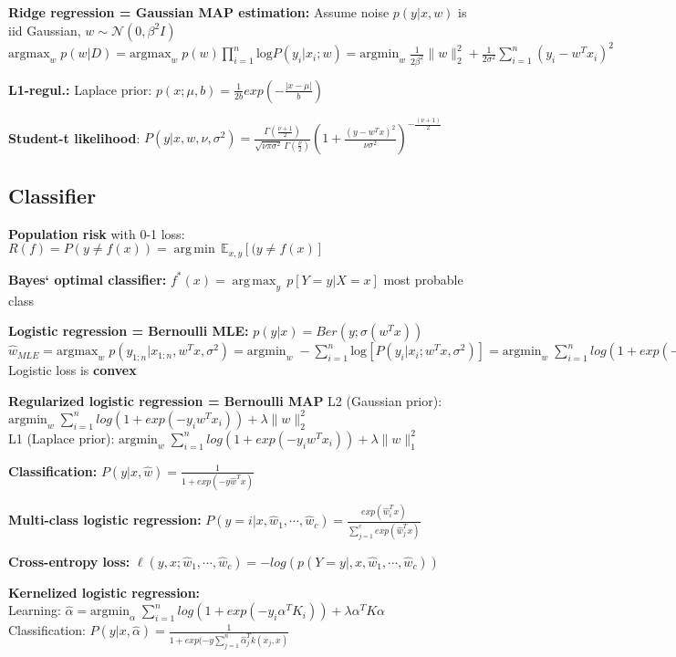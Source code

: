     \textbf{Ridge regression = Gaussian MAP estimation:}
    Assume noise $p(y|x, w)$ is iid Gaussian, $w \sim \mathcal{N}(0, \beta^2I)$
    $ \mathrm{argmax}_w\; p(w|D) =  \mathrm{argmax}_w\; p(w) \prod_{i=1}^n \mathrm{log}P(y_i|x_i;w)= \mathrm{argmin}_w\; \frac{1}{2\beta^2} \| w \|_2^2 + \frac{1}{2\sigma^2}\sum_{i=1}^n (y_i - w^T x_i)^2$

    \textbf{L1-regul.:} Laplace prior: $p(x; \mu, b) = \frac{1}{2b} exp(-\frac{|x - \mu|}{b})$
    
    \textbf{Student-t likelihood}: ${P(y|x, w, \nu, \sigma^2)={\frac {\Gamma ({\frac {\nu +1}{2}})}{{\sqrt {\nu \pi \sigma^2}}\,\Gamma ({\frac {\nu }{2}})}}\left(1+{\frac {
    (y-w^Tx)^{2}}{\nu \sigma^2}}\right)^{-\frac{(\nu +1)}{2}}}$
\subsection{ Classifier}
    \textbf{Population risk} with 0-1 loss:
    $R(f) = P(y \neq f(x)) = { \operatorname {arg\,min} } \,  \mathbb{E}_{x, y}[(y \neq f(x)]$

    \textbf{Bayes‘ optimal classifier: }
    $f^*(x) = { \operatorname {arg\,max} }_y \,p[Y=y|X=x]$ most probable class

    \textbf{Logistic regression = Bernoulli MLE:} $p(y|x) = Ber(y;\sigma(w^Tx))$ \\
    $\hat{w}_{MLE}= \mathrm{argmax}_w\; p(y_{1:n}|x_{1:n}, w^Tx,\sigma^2) =  \mathrm{argmin}_w\; -\sum_{i=1}^n \mathrm{log}\left[ P(y_i|x_i;w^Tx,\sigma^2)\right] = \mathrm{argmin}_w\; \sum_{i=1}^n log(1+exp(-y_iw^Tx_i))$\\
    Logistic loss is \textbf{convex}

    \textbf{Regularized logistic regression = Bernoulli MAP}
    L2 (Gaussian prior): $\mathrm{argmin}_w\; \sum_{i=1}^n log(1+exp(-y_iw^Tx_i)) + \lambda \|w \|_2^2$ \\
    L1 (Laplace prior): $\mathrm{argmin}_w\; \sum_{i=1}^n log(1+exp(-y_iw^Tx_i)) + \lambda \|w \|_1^2$ 

    \textbf{Classification:} $P(y|x, \hat{w}) = \frac{1}{1+exp(-y \hat{w}^Tx)}$
    
    \textbf{Multi-class logistic regression:} $P(y = i|x, \hat{w}_1, \cdots ,\hat{w}_c) = \frac{exp(\hat{w}_i^Tx)}{\sum_{j=1}^c exp(\hat{w}_j^Tx)}$

    \textbf{Cross-entropy loss:} $\ell (y, x;\hat{w}_1, \cdots ,\hat{w}_c) = -log(p(Y=y|, x, \hat{w}_1, \cdots ,\hat{w}_c))$ 

    \textbf{Kernelized logistic regression:} \\
    Learning: $\hat{\alpha} = \mathrm{argmin}_\alpha\; \sum_{i=1}^n log(1+exp(-y_i\alpha^TK_i)) + \lambda \alpha^T K \alpha$ \\
    Classification: $P(y|x, \hat{\alpha}) = \frac{1}{1+exp(-y \sum_{j=1}^n \hat{\alpha}_j^Tk(x_j, x)}$

